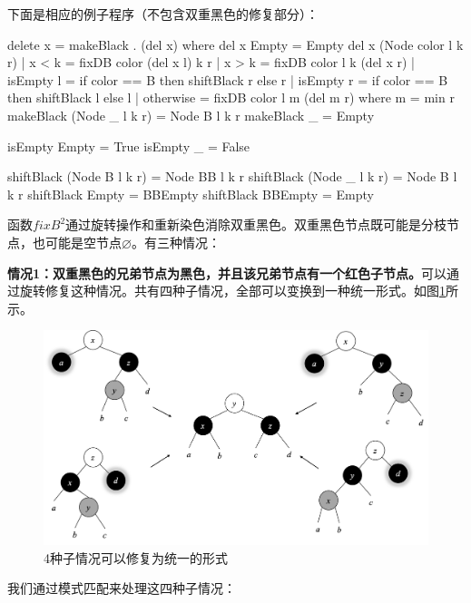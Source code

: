 \documentclass[b5paper]{ctexart}
\begin{document}
下面是相应的例子程序（不包含双重黑色的修复部分）：

\begin{Haskell}
delete x = makeBlack . (del x) where
    del x Empty = Empty
    del x (Node color l k r)
        | x < k = fixDB color (del x l) k r
        | x > k = fixDB color l k (del x r)
        | isEmpty l = if color == B then shiftBlack r else r
        | isEmpty r = if color == B then shiftBlack l else l
        | otherwise = fixDB color l m (del m r) where m = min r
    makeBlack (Node _ l k r) = Node B l k r
    makeBlack _ = Empty

isEmpty Empty = True
isEmpty _ = False

shiftBlack (Node B l k r) = Node BB l k r
shiftBlack (Node _ l k r) = Node B  l k r
shiftBlack Empty = BBEmpty
shiftBlack BBEmpty = Empty
\end{Haskell}

函数$fixB^2$通过旋转操作和重新染色消除双重黑色。双重黑色节点既可能是分枝节点，也可能是空节点$\pmb{\varnothing}$。有三种情况：

\textbf{情况1：双重黑色的兄弟节点为黑色，并且该兄弟节点有一个红色子节点。}可以通过旋转修复这种情况。共有四种子情况，全部可以变换到一种统一形式。如图\ref{fig:del-case1}所示。

\begin{figure}[htbp]
   \centering
   \includegraphics[scale=0.4]{img/del-case1}
   \caption{4种子情况可以修复为统一的形式}
   \label{fig:del-case1}
\end{figure}

我们通过模式匹配来处理这四种子情况：
\end{document}
